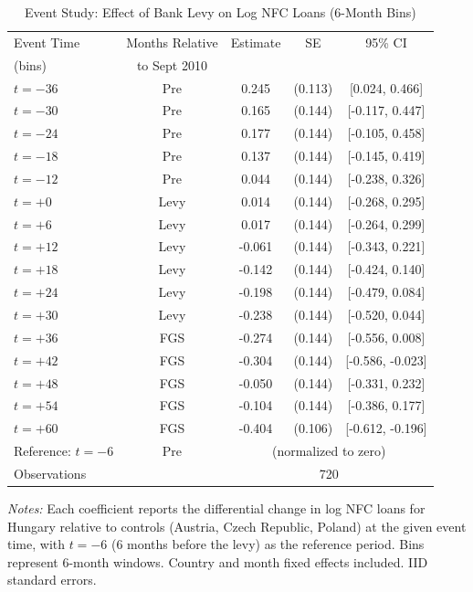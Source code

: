 \begin{table}[H]
\centering
\caption{Event Study: Effect of Bank Levy on Log NFC Loans (6-Month Bins)}
\label{tab:event}
\begin{threeparttable}
\begin{tabular}{lcccc}
\toprule
Event Time & Months Relative & Estimate & SE & 95\% CI \\
(bins) & to Sept 2010 & & & \\
\midrule
$t = -36$ & Pre & 0.245 & (0.113) & [0.024, 0.466] \\
$t = -30$ & Pre & 0.165 & (0.144) & [-0.117, 0.447] \\
$t = -24$ & Pre & 0.177 & (0.144) & [-0.105, 0.458] \\
$t = -18$ & Pre & 0.137 & (0.144) & [-0.145, 0.419] \\
$t = -12$ & Pre & 0.044 & (0.144) & [-0.238, 0.326] \\
$t = +0$ & Levy & 0.014 & (0.144) & [-0.268, 0.295] \\
$t = +6$ & Levy & 0.017 & (0.144) & [-0.264, 0.299] \\
$t = +12$ & Levy & -0.061 & (0.144) & [-0.343, 0.221] \\
$t = +18$ & Levy & -0.142 & (0.144) & [-0.424, 0.140] \\
$t = +24$ & Levy & -0.198 & (0.144) & [-0.479, 0.084] \\
$t = +30$ & Levy & -0.238 & (0.144) & [-0.520, 0.044] \\
$t = +36$ & FGS & -0.274 & (0.144) & [-0.556, 0.008] \\
$t = +42$ & FGS & -0.304 & (0.144) & [-0.586, -0.023] \\
$t = +48$ & FGS & -0.050 & (0.144) & [-0.331, 0.232] \\
$t = +54$ & FGS & -0.104 & (0.144) & [-0.386, 0.177] \\
$t = +60$ & FGS & -0.404 & (0.106) & [-0.612, -0.196] \\
\midrule
Reference: $t = -6$ & Pre & \multicolumn{3}{c}{(normalized to zero)} \\
Observations & & \multicolumn{3}{c}{720} \\
\bottomrule
\end{tabular}
\begin{tablenotes}[flushleft]
\small
\item \textit{Notes:} Each coefficient reports the differential change in log NFC loans for Hungary relative to controls (Austria, Czech Republic, Poland) at the given event time, with $t=-6$ (6 months before the levy) as the reference period. Bins represent 6-month windows. Country and month fixed effects included. IID standard errors.
\end{tablenotes}
\end{threeparttable}
\end{table}
